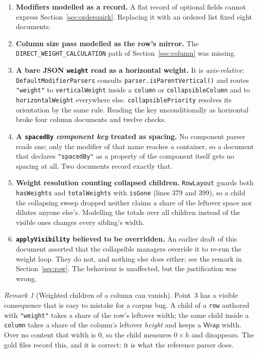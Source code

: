 \documentclass[11pt,a4paper]{article}
\newcommand{\Wrap}{\mathsf{Wrap}}
\newcommand{\jv}[1]{\texttt{#1}}       %
\theoremstyle{definition}
\theoremstyle{plain}
\theoremstyle{remark}
\newtheorem*{remark}{Remark}
\begin{document}
\begin{enumerate}[leftmargin=1.6em]
  \item \textbf{Modifiers modelled as a record.} A flat record of optional
    fields cannot express Section~\ref{sec:orderquirk}. Replacing it with an
    ordered list fixed eight documents.
  \item \textbf{Column size pass modelled as the row's mirror.} The
    \jv{DIRECT\_WEIGHT\_CALCULATION} path of Section~\ref{sec:column} was
    missing.
  \item \textbf{A bare JSON \texttt{weight} read as a horizontal weight.} It is
    \emph{axis-relative}: \jv{DefaultModifierParsers} consults
    \jv{parser.isParentVertical()} and routes \jv{"weight"} to
    \jv{verticalWeight} inside a \jv{column} or \jv{collapsibleColumn} and to
    \jv{horizontalWeight} everywhere else. \jv{collapsiblePriority} resolves its
    orientation by the same rule. Reading the key unconditionally as horizontal
    broke four column documents and twelve checks.
  \item \textbf{A \texttt{spacedBy} \emph{component key} treated as spacing.} No
    component parser reads one; only the modifier of that name reaches a
    container, so a document that declares \jv{"spacedBy"} as a property of the
    component itself gets no spacing at all. Two documents record exactly that.
  \item \textbf{Weight resolution counting collapsed children.} \jv{RowLayout}
    guards both \jv{hasWeights} and \jv{totalWeights} with \jv{isGone}
    (lines 379 and 399), so a child the collapsing sweep dropped neither claims a
    share of the leftover space nor dilutes anyone else's. Modelling the totals
    over all children instead of the visible ones changes every sibling's width.
  \item \textbf{\texttt{applyVisibility} believed to be overridden.} An earlier
    draft of this document asserted that the collapsible managers override it to
    re-run the weight loop. They do not, and nothing else does either; see the
    remark in Section~\ref{sec:row}. The behaviour is unaffected, but the
    justification was wrong.
\end{enumerate}

\begin{remark}[Weighted children of a column can vanish]
Point~3 has a visible consequence that is easy to mistake for a corpus bug. A
child of a \jv{row} authored with \jv{"weight"} takes a share of the row's
leftover width; the same child inside a \jv{column} takes a share of the
column's leftover \emph{height} and keeps a $\Wrap$ width. Over no content that
width is $0$, so the child measures $0 \times h$ and disappears. The gold files
record this, and it is correct: it is what the reference parser does.
\end{remark}
\end{document}
